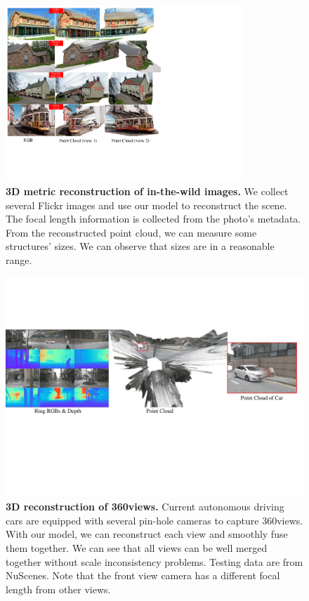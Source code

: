 \begin{figure}[]
\centering
\includegraphics[width=0.8\textwidth]{./files/supp_in_the_wild.pdf}
\caption{\textbf{3D metric reconstruction of in-the-wild images.} We collect several Flickr images and use our model to reconstruct the scene. The focal length information is collected from the photo's metadata. From the reconstructed point cloud, we can measure some structures' sizes. We can observe that sizes are in a reasonable range. }
\label{fig: recon in the wild.}
\end{figure}


\begin{figure}[]
\centering
\includegraphics[width=1\textwidth]{./files/supp_nuscenes_ring2.pdf}
\caption{\textbf{3D reconstruction of 360\degree views.} Current autonomous driving cars are equipped with several pin-hole cameras to capture 360\degree views. With our model, we can reconstruct each view and smoothly fuse them together. We can see that all views can be well merged together without scale inconsistency problems. Testing data are from NuScenes. Note that the front view camera has a different focal length from other views. }
\label{fig: recon nuscenes.}
\end{figure}


